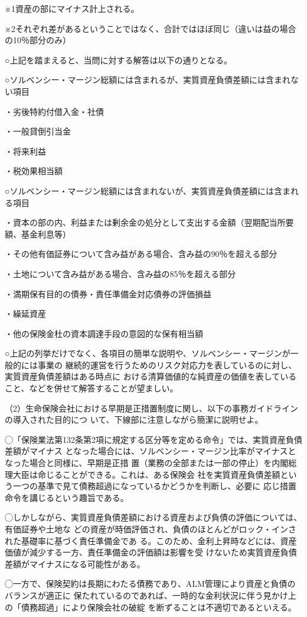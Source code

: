 \documentclass[report,gutter=10mm,fore-edge=10mm,uplatex,dvipdfmx]{jlreq}
\begin{document}
※1資産の部にマイナス計上される。

※2それぞれ差があるということではなく、合計ではほぼ同じ（違いは益の場合の10％部分のみ）


○上記を踏まえると、当問に対する解答は以下の通りとなる。

○ソルベンシー・マージン総額には含まれるが、実質資産負債差額には含まれない項目

・劣後特約付借入金・社債

・一般貸倒引当金

・将来利益

・税効果相当額

○ソルベンシー・マージン総額には含まれないが、実質資産負債差額には含まれる項目

・資本の部の内、利益または剰余金の処分として支出する金額（翌期配当所要額、基金利息等）

・その他有価証券について含み益がある場合、含み益の90％を超える部分

・土地について含み益がある場合、含み益の85％を超える部分

・満期保有目的の債券・責任準備金対応債券の評価損益

・繰延資産

・他の保険金杜の資本調達手段の意図的な保有相当額

○上記の列挙だけでなく、各項目の簡単な説明や、ソルベンシー・マージンが一般的には事業の
継続的運営を行うためのリスク対応力を表しているのに対し、実質資産負債差額はある時点に
おける清算価値的な純資産の価値を表していること、などを併せて解答することが望ましい。


（2）生命保険会社における早期是正措置制度に関し、以下の事務ガイドラインの導入された目的につ
いて、下線部に注意しながら簡潔に説明せよ。

◯「保険業法第132条第2項に規定する区分等を定める命令」では、実質資産負債差額がマイナス
となった場合には、ソルベンシー・マージン比率がマイナスとなった場合と同様に、早期是正措
置（業務の全部または一部の停止）を内閣総理大臣は命じることができる。これは、ある保険会
社を実質資産負債差額という一つの基準で見て債務超過になっているかどうかを判断し、必要に
応じ措置命令を講じるという趣旨である。

◯しかしながら、実質資産負債差額における資産および負債の評価については、有価証券や土地な
どの資産が時価評価され、負債のほとんどがロック・インされた基礎率に基づく責任準備金であ
る。このため、金利上昇時などには、資産価値が減少する一方、責任準備金の評価額は影響を受
けないため実質資産負債差額がマイナスになる可能性がある。

◯一方で、保険契約は長期にわたる債務であり、ALM管理により資産と負債のバランスが適正に
保たれているのであれば、一時的な金利状況に伴う見かけ上の「債務超過」により保険会社の破綻
を断ずることは不適切であるといえる。
\end{document}
